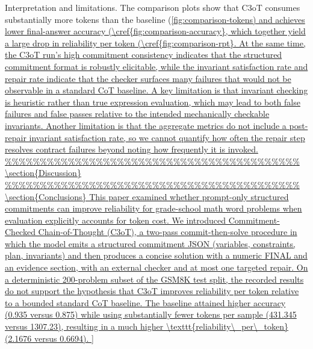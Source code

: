 \documentclass[journal,article,submit,pdftex,moreauthors]{Definitions/mdpi}
\begin{document}
Interpretation and limitations. The comparison plots show that C3oT consumes substantially more tokens than the baseline (\cref{fig:comparison-tokens) and achieves lower final-answer accuracy (\cref{fig:comparison-accuracy}, which together yield a large drop in reliability per token (\cref{fig:comparison-rpt}. At the same time, the C3oT run’s high commitment consistency indicates that the structured commitment format is robustly elicitable, while the invariant satisfaction rate and repair rate indicate that the checker surfaces many failures that would not be observable in a standard CoT baseline. A key limitation is that invariant checking is heuristic rather than true expression evaluation, which may lead to both false failures and false passes relative to the intended mechanically checkable invariants. Another limitation is that the aggregate metrics do not include a post-repair invariant satisfaction rate, so we cannot quantify how often the repair step resolves contract failures beyond noting how frequently it is invoked.

\section{Discussion}



\section{Conclusions}

This paper examined whether prompt-only structured commitments can improve reliability for grade-school math word problems when evaluation explicitly accounts for token cost. We introduced Commitment-Checked Chain-of-Thought (C3oT), a two-pass commit-then-solve procedure in which the model emits a structured commitment JSON (variables, constraints, plan, invariants) and then produces a concise solution with a numeric FINAL and an evidence section, with an external checker and at most one targeted repair.

On a deterministic 200-problem subset of the GSM8K test split, the recorded results do not support the hypothesis that C3oT improves reliability per token relative to a bounded standard CoT baseline. The baseline attained higher accuracy (0.935 versus 0.875) while using substantially fewer tokens per sample (431.345 versus 1307.23), resulting in a much higher \texttt{reliability\_per\_token} (2.1676 versus 0.6694).

}
\end{document}
